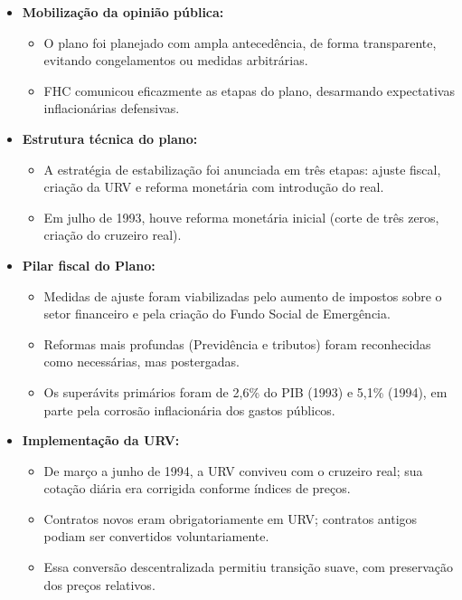 \documentclass[a4paper,12pt]{article}[abntex2]
\begin{document}
\begin{itemize}
    \item \textbf{Mobilização da opinião pública:}
    \begin{itemize}
        \item O plano foi planejado com ampla antecedência, de forma transparente, evitando congelamentos ou medidas arbitrárias.
        \item FHC comunicou eficazmente as etapas do plano, desarmando expectativas inflacionárias defensivas.
    \end{itemize}

    \item \textbf{Estrutura técnica do plano:}
    \begin{itemize}
        \item A estratégia de estabilização foi anunciada em três etapas: ajuste fiscal, criação da URV e reforma monetária com introdução do real.
        \item Em julho de 1993, houve reforma monetária inicial (corte de três zeros, criação do cruzeiro real).
    \end{itemize}

    \item \textbf{Pilar fiscal do Plano:}
    \begin{itemize}
        \item Medidas de ajuste foram viabilizadas pelo aumento de impostos sobre o setor financeiro e pela criação do Fundo Social de Emergência.
        \item Reformas mais profundas (Previdência e tributos) foram reconhecidas como necessárias, mas postergadas.
        \item Os superávits primários foram de 2,6\% do PIB (1993) e 5,1\% (1994), em parte pela corrosão inflacionária dos gastos públicos.
    \end{itemize}

    \item \textbf{Implementação da URV:}
    \begin{itemize}
        \item De março a junho de 1994, a URV conviveu com o cruzeiro real; sua cotação diária era corrigida conforme índices de preços.
        \item Contratos novos eram obrigatoriamente em URV; contratos antigos podiam ser convertidos voluntariamente.
        \item Essa conversão descentralizada permitiu transição suave, com preservação dos preços relativos.
    \end{itemize}


\end{itemize}
\end{document}
